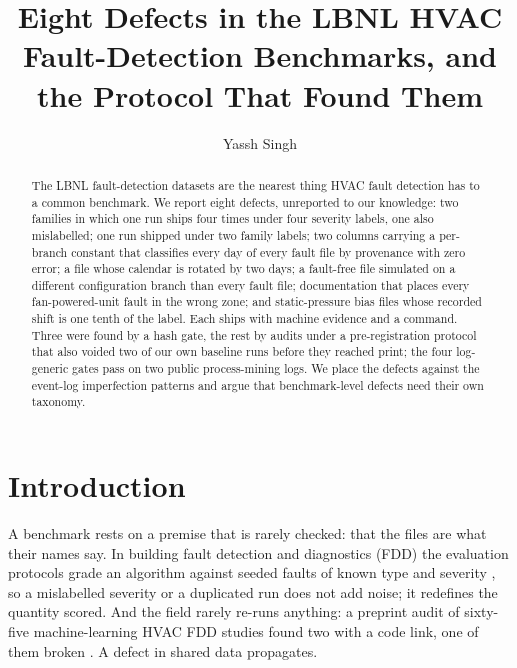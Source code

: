 \documentclass[runningheads]{llncs}
\begin{document}
\title{Eight Defects in the LBNL HVAC Fault-Detection Benchmarks, and the Protocol That Found Them}
\author{Yassh Singh}
\maketitle

\begin{abstract}
The LBNL fault-detection datasets are the nearest thing HVAC fault detection has to a common benchmark. We report eight defects, unreported to our knowledge: two families in which one run ships four times under four severity labels, one also mislabelled; one run shipped under two family labels; two columns carrying a per-branch constant that classifies every day of every fault file by provenance with zero error; a file whose calendar is rotated by two days; a fault-free file simulated on a different configuration branch than every fault file; documentation that places every fan-powered-unit fault in the wrong zone; and static-pressure bias files whose recorded shift is one tenth of the label. Each ships with machine evidence and a command. Three were found by a hash gate, the rest by audits under a pre-registration protocol that also voided two of our own baseline runs before they reached print; the four log-generic gates pass on two public process-mining logs. We place the defects against the event-log imperfection patterns and argue that benchmark-level defects need their own taxonomy.
\end{abstract}

\section{Introduction}
\label{sec:intro}

A benchmark rests on a premise that is rarely checked: that the files are what their names say. In building fault detection and diagnostics (FDD) the evaluation protocols grade an algorithm against seeded faults of known type and severity \cite{frank2018fddevaluation,yuill2013fddprotocol}, so a mislabelled severity or a duplicated run does not add noise; it redefines the quantity scored. And the field rarely re-runs anything: a preprint audit of sixty-five machine-learning HVAC FDD studies found two with a code link, one of them broken \cite{mukhtar2025reproducibility}. A defect in shared data propagates.
\end{document}
